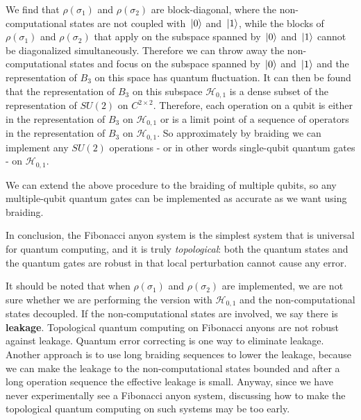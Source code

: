 \documentclass[hyperref, a4paper]{article}
\newcommand*{\concept}[1]{{\textbf{#1}}}
\def\mathbb#1{#1}%
\begin{document}
We find that $\rho(\sigma_1)$ and $\rho(\sigma_2)$ are block-diagonal, where the non-computational 
states are not coupled with $\ket*{0}$ and $\ket*{1}$, while the blocks of $\rho(\sigma_1)$ and $\rho(\sigma_2)$
that apply on the subspace spanned by $\ket*{0}$ and $\ket*{1}$ cannot be diagonalized simultaneously.
Therefore we can throw away the non-computational states and focus on the subspace spanned by $\ket*{0}$ and $\ket*{1}$
and the representation of $B_3$ on this space has quantum fluctuation.
It can then be found that the representation of $B_3$ on this subspace $\mathcal{H}_{0, 1}$ is a dense subset of the representation 
of $SU(2)$ on $\mathbb{C}^{2 \times 2}$.
Therefore, each operation on a qubit is either in the representation of $B_3$ on $\mathcal{H}_{0, 1}$ or is a limit point of a sequence 
of operators in the representation of $B_3$ on $\mathcal{H}_{0, 1}$.
So approximately by braiding we can implement any $SU(2)$ operations - or in other words single-qubit quantum gates - on $\mathcal{H}_{0, 1}$.

We can extend the above procedure to the braiding of multiple qubits, so any multiple-qubit quantum gates can be implemented as 
accurate as we want using braiding. 

In conclusion, the Fibonacci anyon system is the simplest system that is universal for quantum computing, and it is truly 
\emph{topological}: both the quantum states and the quantum gates are robust in that local perturbation cannot cause any error.

It should be noted that when $\rho(\sigma_1)$ and $\rho(\sigma_2)$ are implemented, we are not sure whether we are performing the 
version with $\mathcal{H}_{0, 1}$ and the non-computational states decoupled.
If the non-computational states are involved, we say there is \concept{leakage}. Topological quantum computing on Fibonacci anyons
are not robust against leakage. Quantum error correcting is one way to eliminate leakage. Another approach is to use long braiding
sequences to lower the leakage, because we can make the leakage to the non-computational states bounded and after a long operation
sequence the effective leakage is small. Anyway, since we have never experimentally see a Fibonacci anyon system, discussing how to 
make the topological quantum computing on such systems may be too early.
\end{document}
